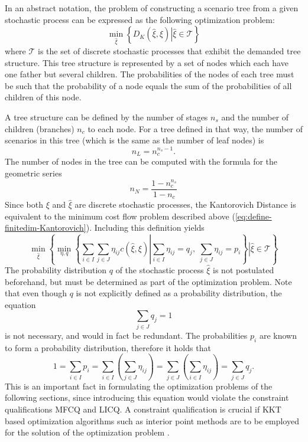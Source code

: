 \documentclass[a4paper, 12pt] {article}
\begin{document}
In an abstract notation, the problem of constructing a scenario tree from a given stochastic process can be expressed as the following optimization problem:
\begin{equation}
  \label{eq:symbolic-optimization-problem}
  \min_{\hat{\xi}}\left\{D_K(\hat{\xi}, \xi)\left|\hat{\xi} \in \mathcal{T}\right.\right\}
\end{equation}
where $\mathcal{T}$ is the set of discrete stochastic processes that exhibit the demanded tree structure.
This tree structure is represented by a set of nodes which each have one father but several children.
The probabilities of the nodes of each tree must be such that the probability of a node equals the sum of the probabilities of all children of this node. 

A tree structure can be defined by the number of stages $n_s$ and the number of children (branches) $n_c$ to each node. For a tree defined in that way, the number of scenarios in this tree (which is the same as the number of leaf nodes) is
\begin{equation}
  \label{eq:number-of-leaf-nodes}
  n_L = n_c^{n_s-1}.
\end{equation}
The number of nodes in the tree can be computed with the formula for the geometric series
\begin{equation}
  \label{eq:number-of-nodes}
  n_N = \frac{1-n_c^{n_s}}{1-n_c}
\end{equation}
Since both $\xi$ and $\hat{\xi}$ are discrete stochastic processes, the Kantorovich Distance is equivalent to the minimum cost flow problem described above (\ref{eq:define-finitedim-Kantorovich}).
Including this definition yields
\begin{equation}
  \label{eq:symbolic-optimization-with-minflow}
  \min_{\hat{\xi}}\left\{\min_{\eta,q}\left\{\sum_{i\in I}\sum_{j\in J}\eta_{ij}c(\hat{\xi}, \xi)\left|\sum_{i\in I}\eta_{ij}=q_j,\;\sum_{j\in J}\eta_{ij}=p_i\right.\right\}\left|\hat{\xi} \in \mathcal{T}\right.\right\}
\end{equation}
The probability distribution $q$ of the stochastic process $\hat{\xi}$ is not postulated beforehand, but must be determined as part of the optimization problem. Note that even though $q$ is not explicitly defined as a probability distribution, the equation
\begin{equation}
  \label{eq:q-schliessbedingung}
  \sum_{j\in J} q_j = 1
\end{equation}
is not necessary, and would in fact be redundant. The probabilities $p_i$ are known to form a probability distribution, therefore it holds that
\begin{equation}
  \label{eq:proof-sum-q-redundant}
  1 = \sum_{i\in I}p_i = \sum_{i\in I}\left(\sum_{j\in J}\eta_{ij}\right)=\sum_{j\in J}\left(\sum_{i\in I}\eta_{ij}\right)=\sum_{j\in J} q_j.
\end{equation}
This is an important fact in formulating the optimization problems of the following sections, since introducing this equation would violate the constraint qualifications MFCQ and LICQ.
A constraint qualification is crucial if KKT based optimization algorithms such as interior point methods are to be employed for the solution of the optimization problem \cite{Jongen2004}.
\end{document}

